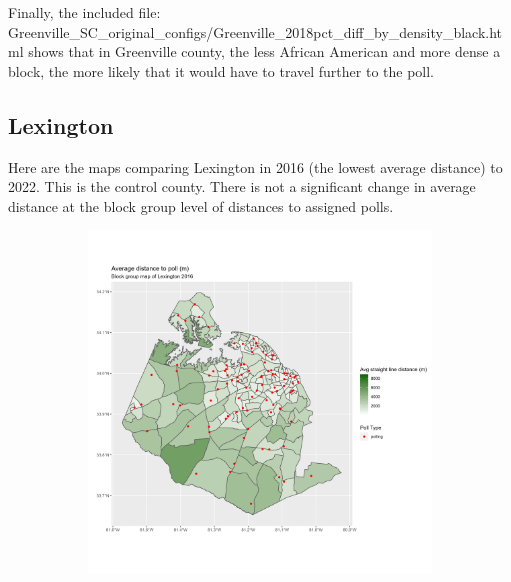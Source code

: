 \documentclass[11pt]{article}
\theoremstyle{remark}
\theoremstyle{definition}
\begin{document}
Finally, the included file: \textrm{Greenville\_SC\_original\_configs/Greenville\_2018pct\_diff\_by\_density\_black.html} shows that in Greenville county, the less African American and more dense a block, the more likely that it would have to travel further to the poll. 

\pagebreak 

\subsection{Lexington}
Here are the maps comparing Lexington in 2016 (the lowest average distance) to 2022. This is the control county. There is not a significant change in average distance at the block group level of distances to assigned polls.

\begin{figure}
	\begin{subfigure}{.5\textwidth}
		\centering
		\includegraphics[width=\linewidth]{result_analysis/Lexington_SC_original_configs/distance_map_Lexington_config_original_2016_polls.png}
		\label{sfig:York_2016_bg_dist}
	\end{subfigure} 
	\begin{subfigure}{.5\textwidth}
		\centering

\end{subfigure}
\end{figure}
\end{document}
